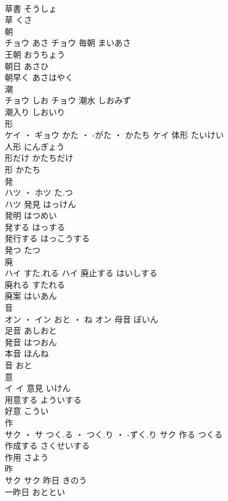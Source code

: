 \documentclass[8pt]{extreport}
\begin{document}
\begin{CJK}{UTF8}{min}
\\	草書	そうしょ	
\\	草	くさ	
\\	朝	
\\	チョウ	あさ	チョウ	毎朝	まいあさ	
\\	王朝	おうちょう	
\\	朝日	あさひ	
\\	朝早く	あさはやく	
\\	潮	
\\	チョウ	しお	チョウ													潮水	しおみず	
\\	潮入り	しおいり	
\\	形	
\\	ケイ ・ ギョウ	かた ・ -がた ・ かたち	ケイ	体形	たいけい	
\\	人形	にんぎょう	
\\	形だけ	かたちだけ	
\\	形	かたち	
\\	発	
\\	ハツ ・ ホツ	た.つ
\\	ハツ	発見	はっけん	
\\	発明	はつめい	
\\	発する	はっする	
\\	発行する	はっこうする	
\\	発つ	たつ	
\\	廃	
\\	ハイ	すた.れる	ハイ	廃止する	はいしする	
\\	廃れる	すたれる	
\\	廃案	はいあん	
\\	音	
\\	オン ・ イン	おと ・ ね	オン	母音	ぼいん	
\\	足音	あしおと	
\\	発音	はつおん	
\\	本音	ほんね	
\\	音	おと	
\\	意	
\\	イ		イ	意見	いけん	
\\	用意する	よういする	
\\	好意	こうい	
\\	作	
\\	サク ・ サ	つく.る ・ つく.り ・ -ずく.り	サク	作る	つくる	
\\	作成する	さくせいする	
\\	作用	さよう	
\\	昨	
\\	サク		サク	昨日	きのう	
\\	一昨日	おととい	

\end{CJK}
\end{document}
